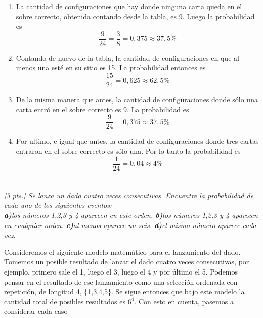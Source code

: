 \documentclass[11pt]{article}
\renewcommand{\(}{\left(}
\renewcommand{\)}{\right)}
\begin{document}
\begin{enumerate}
	\item La cantidad de configuraciones que hay donde ninguna carta queda en el sobre correcto, obtenida contando desde la tabla, es 9. Luego la probabilidad es $$ \frac{9}{24} = \frac{3}{8} = 0,375 \approx 37,5\% $$
	\item Contando de nuevo de la tabla, la cantidad de configuraciones en que al menos una esté en su sitio es 15. La probabilidad entonces es $$ \frac{15}{24} = 0,625 \approx 62,5\% $$
	\item De la misma manera que antes, la cantidad de configuraciones donde sólo una carta entró en el sobre correcto es 9. La probabilidad es $$\frac{9}{24} = 0,375 \approx 37,5\%$$
	\item Por ultimo, e igual que antes, la cantidad de configuraciones donde tres cartas entraron en el sobre correcto es sólo una. Por lo tanto la probabilidad es $$\frac{1}{24} = 0,04 \approx 4\%$$
\end{enumerate}

\section{}

\textit{[3 pts.] Se lanza un dado cuatro veces consecutivas. Encuentre la probabilidad de cada uno de los siguientes eventos: \\ \textbf{a)}los números 1,2,3 y 4 aparecen en este orden. \textbf{b)}los números 1,2,3 y 4 aparecen en cualquier orden. \textbf{c)}al menos aparece un seis. \textbf{d)}el mismo número aparece cada vez.}

Consideremos el siguiente modelo matemático para el lanzamiento del dado. Tomemos un posible resultado de lanzar el dado cuatro veces consecutivas, por ejemplo, primero sale el 1, luego el 3, luego el 4 y por último el 5. Podemos pensar en el resultado de ese lanzamiento como una selección ordenada con repetición, de longitud 4, \{1,3,4,5\}. Se sigue entonces que bajo este modelo la cantidad total de posibles resultados es $6^4$. Con esto en cuenta, pasemos a considerar cada caso
\end{document}
